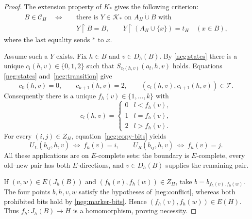\documentclass{article}
\numberwithin{equation}{section}
\theoremstyle{definition}
\newcommand{\res}{\mathbin{\upharpoonright}}
\begin{document}
\begin{proof}
The extension property of $K_*$ gives the following criterion:
\begin{equation}\label{neg:completion}
 \begin{split}
 B\in\mathcal C_H\quad\Longleftrightarrow\quad
 &\text{there is }Y\in\mathcal K_*\text{ on }A_H\dot\cup B\text{ with}\\
 &Y\res B=B,\qquad
 Y\res(A_H\cup\{x\})=t_H\quad(x\in B),
 \end{split}
\end{equation}
where the last equality sends $*$ to $x$.

Assume such a $Y$ exists. Fix $h\in B$ and $v\in D_h(B)$. By
\eqref{neg:states} there is a unique $c_l(h,v)\in\{0,1,2\}$ such that
$S_{c_l(h,v)}(a_l,h,v)$ holds. Equations
\eqref{neg:states} and~\eqref{neg:transition} give
\[
 c_0(h,v)=0,\qquad c_{k+1}(h,v)=2,\qquad
 (c_l(h,v),c_{l+1}(h,v))\in\mathcal T.
\]
Consequently there is a unique $f_h(v)\in\{1,\ldots,k\}$ with
\begin{equation}\label{neg:marker}
 c_l(h,v)=
 \begin{cases}
 0&l<f_h(v),\\1&l=f_h(v),\\2&l>f_h(v).
 \end{cases}
\end{equation}
For every $(i,j)\in Z_H$, equation~\eqref{neg:copy-bits} yields
\begin{equation}\label{neg:marker-bits}
 U_L(b_{ij},h,v)\ \Longleftrightarrow\ f_h(v)=i,
 \qquad
 U_R(b_{ij},h,v)\ \Longleftrightarrow\ f_h(v)=j.
\end{equation}
All these applications are on $E$-complete sets: the boundary is
$E$-complete, every old--new pair has both $E$-directions, and
$v\in D_h(B)$ supplies the remaining pair.

If $(v,w)\in E(J_h(B))$ and
$(f_h(v),f_h(w))\in Z_H$, take $b=b_{f_h(v),f_h(w)}$.
The four points $b,h,v,w$ satisfy the hypotheses of
\eqref{neg:conflict}, whereas both prohibited bits hold by
\eqref{neg:marker-bits}. Hence $(f_h(v),f_h(w))\in E(H)$.
Thus $f_h:J_h(B)\to H$ is a homomorphism, proving necessity.


\end{proof}
\end{document}
